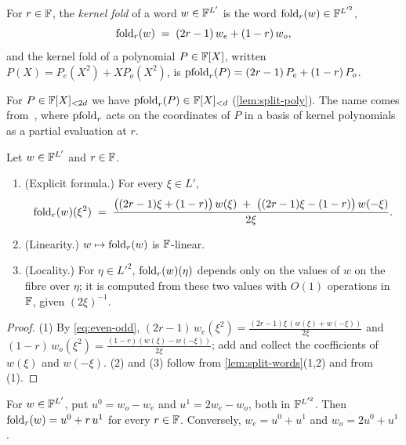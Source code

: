 \begin{definition}\label{def:fold}
For $r \in \mathbb{F}$, the \emph{kernel fold} of a word $w \in \mathbb{F}^{L'}$ is the word $\mathrm{fold}_r(w) \in \mathbb{F}^{L'^2}$,
\[
  \mathrm{fold}_r(w) \;=\; (2r-1)\,w_e + (1-r)\,w_o,
\]
and the kernel fold of a polynomial $P \in \mathbb{F}[X]$, written $P(X) = P_e(X^2) + X P_o(X^2)$, is $\mathrm{pfold}_r(P) = (2r-1)\,P_e + (1-r)\,P_o$.
\end{definition}

For $P \in \mathbb{F}[X]_{<2d}$ we have $\mathrm{pfold}_r(P) \in \mathbb{F}[X]_{<d}$ (\cref{lem:split-poly}).
The name comes from~\cite{Mkh26}, where $\mathrm{pfold}_r$ acts on the coordinates of $P$ in a basis of kernel polynomials as a partial evaluation at $r$.

\begin{lemma}\label{lem:fold-word}
Let $w \in \mathbb{F}^{L'}$ and $r \in \mathbb{F}$.
\begin{enumerate}
  \item (Explicit formula.) For every $\xi \in L'$,
  \begin{equation}\label{eq:fold-explicit}
    \mathrm{fold}_r(w)(\xi^2) \;=\; \frac{\bigl((2r-1)\xi + (1-r)\bigr)\, w(\xi) \;+\; \bigl((2r-1)\xi - (1-r)\bigr)\, w(-\xi)}{2\xi}.
  \end{equation}
  \item (Linearity.) $w \mapsto \mathrm{fold}_r(w)$ is $\mathbb{F}$-linear.
  \item (Locality.) For $\eta \in L'^2$, $\mathrm{fold}_r(w)(\eta)$ depends only on the values of $w$ on the fibre over $\eta$; it is computed from these two values with $O(1)$ operations in $\mathbb{F}$, given $(2\xi)^{-1}$.
\end{enumerate}
\end{lemma}

\begin{proof}
(1) By \eqref{eq:even-odd}, $(2r-1)\,w_e(\xi^2) = \frac{(2r-1)\xi\,(w(\xi)+w(-\xi))}{2\xi}$ and $(1-r)\,w_o(\xi^2) = \frac{(1-r)(w(\xi)-w(-\xi))}{2\xi}$; add and collect the coefficients of $w(\xi)$ and $w(-\xi)$.
(2) and (3) follow from \cref{lem:split-words}(1,2) and from (1).
\end{proof}

\begin{lemma}\label{lem:line}
For $w \in \mathbb{F}^{L'}$, put $u^0 = w_o - w_e$ and $u^1 = 2w_e - w_o$, both in $\mathbb{F}^{L'^2}$. Then $\mathrm{fold}_r(w) = u^0 + r\,u^1$ for every $r \in \mathbb{F}$.
Conversely, $w_e = u^0 + u^1$ and $w_o = 2u^0 + u^1$.
\end{lemma}

